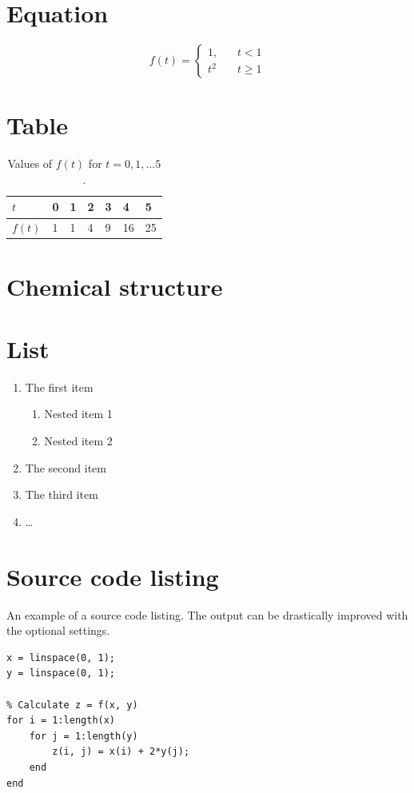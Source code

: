 \section{Equation}
\begin{equation}
    f(t)=\left\{ \begin{array}{ll}
    1,~~~~ & t< 1 \\
    t^2 & t\geq 1
\end{array}\right.
\end{equation}

\section{Table}
\begin{table}[H]
    \centering
    \caption{Values of $f(t)$ for $t=0,1,\dots 5$.}
    \begin{tabular}{lllllll}
        \toprule
        $t$ & 0 & 1 & 2 & 3 & 4 & 5 \\ \midrule
        $f(t)$ & 1 & 1 & 4 & 9 & 16 & 25 \\ \bottomrule
    \end{tabular}
\end{table}

\section{Chemical structure}
\begin{center}
\end{center}

\section{List}
\begin{enumerate}
    \item The first item
    \begin{enumerate}
        \item Nested item 1
        \item Nested item 2
    \end{enumerate}
    \item The second item
    \item The third item
    \item \dots
\end{enumerate}

\section{Source code listing}
An example of a source code listing.
The output can be drastically improved with the optional settings.
\lstset{language=Matlab}
\begin{lstlisting}[frame=single]
% Generate x- and y-nodes
x = linspace(0, 1);
y = linspace(0, 1);

% Calculate z = f(x, y)
for i = 1:length(x)
    for j = 1:length(y)
        z(i, j) = x(i) + 2*y(j);
    end
end
\end{lstlisting}

